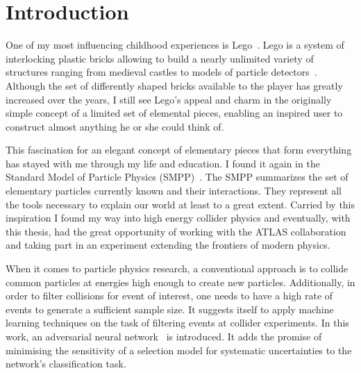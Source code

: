 

\chapter{Introduction}
\label{sec:intro}

One of my most influencing childhood experiences is {Lego\textsuperscript{\textregistered}}~\cite{lego}. Lego is a system of interlocking plastic bricks allowing to build a nearly unlimited variety of structures ranging from medieval castles to models of particle detectors~\cite{atlas_lego}. Although the set of differently shaped bricks available to the player has greatly increased over the years, I still see Lego's appeal and charm in the originally simple concept of a limited set of elemental pieces, enabling an inspired user to construct almost anything he or she could think of.

This fascination for an elegant concept of elementary pieces that form everything has stayed with me through my life and education. I found it again in the Standard Model of Particle Physics (SMPP)~\cite{thomson}.
The SMPP summarizes the set of elementary particles currently known and their interactions. They represent all the tools necessary to explain our world at least to a great extent.
Carried by this inspiration I found my way into high energy collider physics and eventually, with this thesis, had the great opportunity of working with the ATLAS collaboration and taking part in an experiment extending the frontiers of modern physics.

When it comes to particle physics research, a conventional approach is to collide common particles at energies high enough to create new particles. Additionally, in order to filter collisions for event of interest, one needs to have a high rate of events to generate a sufficient sample size.
It suggests itself to apply machine learning techniques on the task of filtering events at collider experiments.
In this work, an adversarial neural network~\cite{Louppe:2016ylz} is introduced. It adds the promise of minimising the sensitivity of a selection model for systematic uncertainties to the network's classification task.

